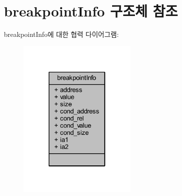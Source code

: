 \hypertarget{structbreakpoint_info}{}\section{breakpoint\+Info 구조체 참조}
\label{structbreakpoint_info}


breakpoint\+Info에 대한 협력 다이어그램\+:\nopagebreak
\begin{figure}[H]
\begin{center}
\leavevmode
\includegraphics[width=166pt]{structbreakpoint_info__coll__graph}
\end{center}
\end{figure}
